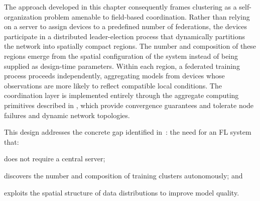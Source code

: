 The approach developed in this chapter consequently frames clustering
 as a self-organization problem amenable to field-based coordination.
%
Rather than relying on a server to assign devices 
 to a predefined number of federations,
 the devices participate in a distributed leader-election process that
 dynamically partitions the network into spatially compact regions.
%
The number and composition of these regions emerge from the spatial
 configuration of the system instead of being supplied as design-time
 parameters.
%
Within each region, 
 a federated training process proceeds independently, 
 aggregating models from devices whose observations are more likely to
 reflect compatible local conditions.
%
The coordination layer is implemented entirely through 
 the aggregate computing primitives described in ,
 which provide convergence guarantees and tolerate node failures 
 and dynamic network topologies.

This design addresses the concrete gap identified in~:
 the need for an \gls{FL} system that:
 \begin{enumerate*}[label=(\roman*)]
  \item does not require a central server;
  \item discovers the number and composition of training clusters autonomously; and
  \item exploits the spatial structure of data distributions to improve model quality.
 \end{enumerate*}



